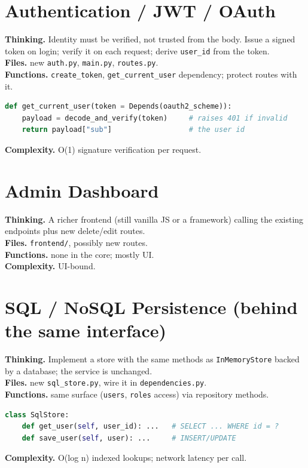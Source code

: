 \documentclass[11pt,a4paper]{report}
\begin{document}
\section{Authentication / JWT / OAuth}
\textbf{Thinking.} Identity must be verified, not trusted from the body. Issue a
signed token on login; verify it on each request; derive \texttt{user\_id} from
the token.\\
\textbf{Files.} new \texttt{auth.py}, \texttt{main.py}, \texttt{routes.py}.\\
\textbf{Functions.} \texttt{create\_token}, \texttt{get\_current\_user}
dependency; protect routes with it.
\begin{lstlisting}[language=Python]
def get_current_user(token = Depends(oauth2_scheme)):
    payload = decode_and_verify(token)     # raises 401 if invalid
    return payload["sub"]                  # the user id
\end{lstlisting}
\textbf{Complexity.} O(1) signature verification per request.

\section{Admin Dashboard}
\textbf{Thinking.} A richer frontend (still vanilla JS or a framework) calling the
existing endpoints plus new delete/edit routes.\\
\textbf{Files.} \texttt{frontend/}, possibly new routes.\\
\textbf{Functions.} none in the core; mostly UI.\\
\textbf{Complexity.} UI-bound.

\section{SQL / NoSQL Persistence (behind the same interface)}
\textbf{Thinking.} Implement a store with the same methods as \texttt{InMemoryStore}
backed by a database; the service is unchanged.\\
\textbf{Files.} new \texttt{sql\_store.py}, wire it in \texttt{dependencies.py}.\\
\textbf{Functions.} same surface (\texttt{users}, \texttt{roles} access) via
repository methods.
\begin{lstlisting}[language=Python]
class SqlStore:
    def get_user(self, user_id): ...   # SELECT ... WHERE id = ?
    def save_user(self, user): ...     # INSERT/UPDATE
\end{lstlisting}
\textbf{Complexity.} O(log n) indexed lookups; network latency per call.
\end{document}
